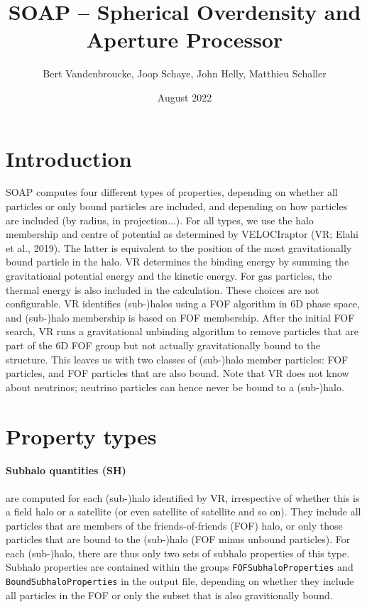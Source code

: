 \documentclass{article}
\title{SOAP -- Spherical Overdensity and Aperture Processor}
\author{Bert Vandenbroucke, Joop Schaye, John Helly, Matthieu Schaller}
\date{August 2022}
\begin{document}
\maketitle

\section{Introduction}

SOAP computes four different types of properties, depending on whether all particles or only bound particles 
are included, and depending on how particles are included (by radius, in projection...). For all types, we use 
the halo membership and centre of potential as determined by VELOCIraptor (VR; Elahi et al., 2019). The latter 
is equivalent to the position of the most gravitationally bound particle in the halo. VR determines the 
binding energy by summing the gravitational potential energy and the kinetic energy. For gas particles, the 
thermal energy is also included in the calculation. These choices are not configurable. VR identifies 
(sub-)halos using a FOF algorithm in 6D phase space, and (sub-)halo membership is based on FOF membership. 
After the initial FOF search, VR runs a gravitational unbinding algorithm to remove particles that are part of 
the 6D FOF group but not actually gravitationally bound to the structure. This leaves us with two classes of 
(sub-)halo member particles: FOF particles, and FOF particles that are also bound. Note that VR does not know 
about neutrinos; neutrino particles can hence never be bound to a (sub-)halo.

\section{Property types}

\paragraph{Subhalo quantities (SH)} are computed for each (sub-)halo identified by VR, irrespective of whether 
this is a field halo or a satellite (or even satellite of satellite and so on). They include all particles 
that are members of the friends-of-friends (FOF) halo, or only those particles that are bound to the 
(sub-)halo (FOF minus unbound particles). For each (sub-)halo, there are thus only two sets of subhalo 
properties of this type. Subhalo properties are contained within the groups \verb+FOFSubhaloProperties+ and 
\verb+BoundSubhaloProperties+ in the output file, depending on whether they include all particles in the FOF 
or only the subset that is also gravitionally bound.
\end{document}
